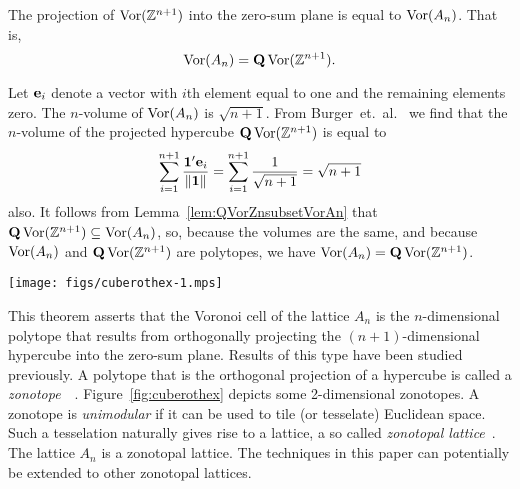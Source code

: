 \documentclass[journal, onecolumn, 11pt]{IEEEtran}
\begin{document}
\begin{theorem}  \label{thm:VorAn=QVorZn1}
The projection of $\operatorname{Vor}({\mathbb Z}^{n+1})$ into the zero-sum plane is equal to $\operatorname{Vor}(A_{n})$. That is,
\[
\operatorname{Vor}(A_n) = \mathbf{Q}\operatorname{Vor}({\mathbb Z}^{n+1}).
\]
\end{theorem}
\begin{IEEEproof}
Let $\mathbf{e}_i$ denote a vector with $i$th element equal to one and the remaining elements zero.  The $n$-volume of $\operatorname{Vor}(A_n)$ is $\sqrt{n + 1}$.  From Burger~et.~al.~\cite[Theorem 1.1]{Burger1996} we find that the $n$-volume of the projected hypercube $\mathbf{Q}\operatorname{Vor}({\mathbb Z}^{n+1})$ is equal to
\[
\sum_{i = 1}^{n+1} \frac{\boldsymbol{1}^\prime \mathbf{e}_i}{\|\boldsymbol{1}\|} =  \sum_{i = 1}^{n+1} \frac{1}{\sqrt{n+1}} = \sqrt{n + 1}
\]
also. It follows from Lemma~\ref{lem:QVorZnsubsetVorAn} that $\mathbf{Q}\operatorname{Vor}({\mathbb Z}^{n+1}) \subseteq \operatorname{Vor}(A_n)$, so, because the volumes are the same, and because $\operatorname{Vor}(A_n)$ and $\mathbf{Q}\operatorname{Vor}({\mathbb Z}^{n+1})$ are polytopes, we have $\operatorname{Vor}(A_n) = \mathbf{Q}\operatorname{Vor}({\mathbb Z}^{n+1})$.
\end{IEEEproof}

\begin{figure*}[tp]
	\centering
		\texttt{[image: figs/cuberothex-1.mps]}
		\caption{Orthogonal projection of a cube as it is rotated about its center.  The figure of the left is the view of a cube from side on, and the boundary is a square.  When the cube is rotated the boundary becomes a hexagon.  The hexagon is regular when the cube is viewed along one of its vertices (the rightmost figure).  The regular hexagon is the Voronoi cell of the hexagonal lattice $A_2$.  Every 2-dimensional zonotope is also unimodular so the boundary of each of the figures above can be used to tile 2-dimensional Euclidean space~\cite{McMullen_space_tiling_zonotopes_1975}.}
		\label{fig:cuberothex}
\end{figure*}

This theorem asserts that the Voronoi cell of the lattice $A_n$ is the $n$-dimensional polytope that results from orthogonally projecting the $(n+1)$-dimensional hypercube into the zero-sum plane.  Results of this type have been studied previously.  A polytope that is the orthogonal projection of a hypercube is called a \emph{zonotope}~\cite[p.~313]{surveys_combin_zonotopes_1997}~\cite{McMullen_space_tiling_zonotopes_1975}.  Figure~\ref{fig:cuberothex} depicts some 2-dimensional zonotopes.  A zonotope is \emph{unimodular} if it can be used to tile (or tesselate) Euclidean space.  Such a tesselation naturally gives rise to a lattice, a so called \emph{zonotopal lattice}~\cite{Vallentin_space_tiling_zonotope_2004}.  The lattice $A_n$ is a zonotopal lattice.  The techniques in this paper can potentially be extended to other zonotopal lattices. 
\end{document}
